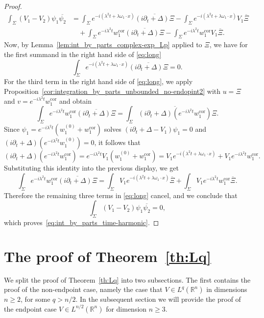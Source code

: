 \documentclass[11pt,a4paper]{amsart}
\theoremstyle{remark}
\theoremstyle{definition}
\newcommand{\R}{\mathbb{R}}
\def\ovl{\overline}
\def\d{\partial}
\begin{document}
\begin{proof}
\begin{equation}
\begin{split}
\int_\Sigma (V_1 - V_2)\psi_1 \ovl{\psi_2} &= \int_\Sigma e^{-i (\lambda^2 t + \lambda\omega_1\cdot x)} \ovl{\left(i \d_t +\Delta\right ) \Xi} - \int_\Sigma e^{-i (\lambda^2 t + \lambda \omega_1\cdot x)} V_1 \ovl{\Xi} 
\\
&\quad + \int_\Sigma e^{-i\lambda^2 t}w^{\mathrm{cor}}_1 \ovl{\left(i \d_t + \Delta\right) \Xi} - \int_\Sigma e^{-i\lambda^2 t}w^{\mathrm{cor}}_1 V_1 \ovl{\Xi}.
\end{split}
\end{equation}
Now, by Lemma~\ref{lem:int_by_parts_complex-exp_Lp} applied to $\Xi$, we have for the first summand in the right hand side of \eqref{eq:long}
\[
\int_\Sigma e^{-i (\lambda^2 t + \lambda\omega_1\cdot x)} \ovl{\left(i \d_t +\Delta\right) \Xi}=0.
\]
For the third term in the right hand side of \eqref{eq:long}, we apply Proposition~\ref{cor:integration_by_parts_unbounded_no-endopint2}
with $u=\Xi$ and $v=e^{-i\lambda^2 t}w^{\mathrm{cor}}_1$ and obtain
\[
\int_\Sigma e^{-i\lambda^2 t}w^{\mathrm{cor}}_1 \ovl{\left(i \d_t + \Delta\right)\Xi} = \int_\Sigma \ovl{\left(i\d_t+\Delta\right)\left(e^{-i\lambda^2 t}w^{\mathrm{cor}}_1\right)} \Xi.
\]
Since $\psi_1=e^{-i\lambda^2 t}(w^{(0)}_1+w^{\mathrm{cor}}_1)$ solves $(i\partial_t+\Delta-V_1)\psi_1=0$ and $(i\partial_t+\Delta) (e^{-i\lambda^2 t}w^{(0)}_1)=0$,
it follows that
\[
\left(i\d_t+\Delta\right)\left(e^{-i\lambda^2 t}w^{\mathrm{cor}}_1\right) = e^{-i\lambda^2 t}V_1\left(w^{(0)}_1+w^{\mathrm{cor}}_1\right) = V_1 e^{-i (\lambda^2 t + \lambda\omega_1\cdot x)}+ V_1 e^{-i\lambda^2 t}w^{\mathrm{cor}}_1 .
\]
Substituting this identity into the previous display, we get
\[
\int_\Sigma e^{-i\lambda^2 t}w^{\mathrm{cor}}_1 \ovl{\left(i \d_t + \Delta\right)\Xi} = \int_\Sigma V_1 e^{-i \left(\lambda^2 t + \lambda\omega_1\cdot x\right)} \ovl{\Xi} + \int_\Sigma V_1 e^{-i\lambda^2 t}w^{\mathrm{cor}}_1 \ovl{\Xi}.
\]
Therefore the remaining three terms in \eqref{eq:long} cancel, and we conclude that
\[
\int_\Sigma (V_1 - V_2)\psi_1 \ovl{\psi_2}=0,
\]
which proves~\eqref{eq:int_by_parts_time-harmonic}.
\end{proof}


\section{The proof of Theorem~\ref{th:Lq}}\label{sec:unbounded_endpoint} We split the proof of Theorem~\ref{th:Lq} into two subsections. The first contains the proof of the non-endpoint case, namely the case that $V\in L^q(\R^n)$ in dimensions $n\geq 2$, for some $q>n/2$. In the subsequent section we will provide the proof of the endpoint case $V\in L^{n/2}(\R^n)$ for dimension $n\geq 3$.
\end{document}
